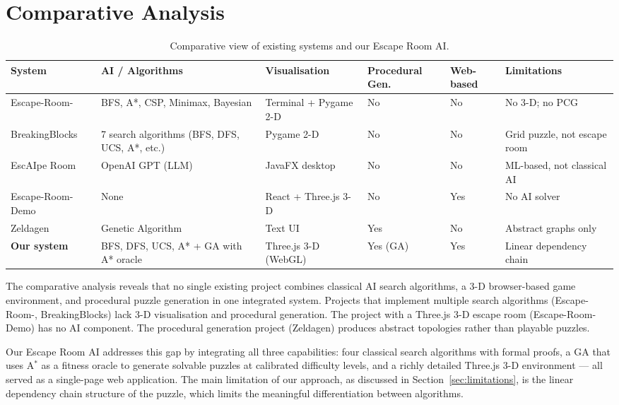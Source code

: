\documentclass[12pt, a4paper]{report}
\begin{document}
\section{Comparative Analysis}

\begin{table}[H]
\centering
\caption{Comparative view of existing systems and our Escape Room AI.}
\label{tab:existing_systems}
\small
\begin{tabular}{@{}p{2.4cm}p{2.8cm}p{2.2cm}p{1.5cm}p{1.5cm}p{1.8cm}@{}}
\toprule
\textbf{System} & \textbf{AI / Algorithms} & \textbf{Visualisation} & \textbf{Procedural Gen.} & \textbf{Web-based} & \textbf{Limitations} \\
\midrule
Escape-Room- \cite{gh_escaperoom}
  & BFS, A{*}, CSP, Minimax, Bayesian
  & Terminal + Pygame 2-D
  & No
  & No
  & No 3-D; no PCG \\[6pt]
BreakingBlocks \cite{gh_breakingblocks}
  & 7 search algorithms (BFS, DFS, UCS, A{*}, etc.)
  & Pygame 2-D
  & No
  & No
  & Grid puzzle, not escape room \\[6pt]
EscAIpe Room \cite{gh_escaipe}
  & OpenAI GPT (LLM)
  & JavaFX desktop
  & No
  & No
  & ML-based, not classical AI \\[6pt]
Escape-Room-Demo \cite{gh_escapedemo}
  & None
  & React + Three.js 3-D
  & No
  & Yes
  & No AI solver \\[6pt]
Zeldagen \cite{gh_zeldagen}
  & Genetic Algorithm
  & Text UI
  & Yes
  & No
  & Abstract graphs only \\[6pt]
\midrule
\textbf{Our system}
  & BFS, DFS, UCS, A{*} + GA with A{*} oracle
  & Three.js 3-D (WebGL)
  & Yes (GA)
  & Yes
  & Linear dependency chain \\
\bottomrule
\end{tabular}
\end{table}

The comparative analysis reveals that no single existing project combines classical AI search algorithms, a 3-D browser-based game environment, and procedural puzzle generation in one integrated system.  Projects that implement multiple search algorithms (Escape-Room-, BreakingBlocks) lack 3-D visualisation and procedural generation.  The project with a Three.js 3-D escape room (Escape-Room-Demo) has no AI component.  The procedural generation project (Zeldagen) produces abstract topologies rather than playable puzzles.

Our Escape Room AI addresses this gap by integrating all three capabilities: four classical search algorithms with formal proofs, a GA that uses A$^{\ast}$ as a fitness oracle to generate solvable puzzles at calibrated difficulty levels, and a richly detailed Three.js 3-D environment --- all served as a single-page web application.  The main limitation of our approach, as discussed in Section~\ref{sec:limitations}, is the linear dependency chain structure of the puzzle, which limits the meaningful differentiation between algorithms.
\end{document}
